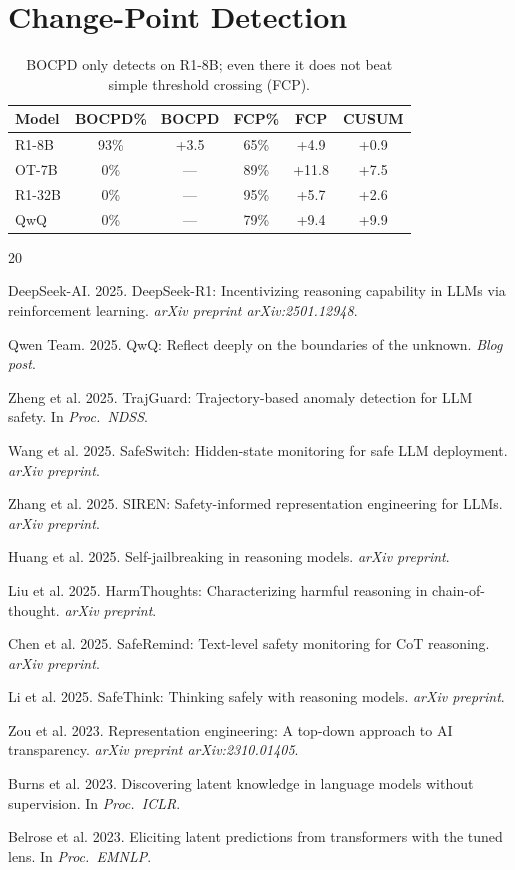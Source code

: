 \documentclass[11pt,a4paper]{article}
\begin{document}
\section{Change-Point Detection}
\label{app:cpd}

\begin{table}[h]
\centering
\small
\begin{tabular}{lccccc}
\toprule
\textbf{Model} & \textbf{BOCPD\%} & \textbf{BOCPD} & \textbf{FCP\%} & \textbf{FCP} & \textbf{CUSUM} \\
\midrule
R1-8B & 93\% & +3.5 & 65\% & +4.9 & +0.9 \\
OT-7B & 0\% & --- & 89\% & +11.8 & +7.5 \\
R1-32B & 0\% & --- & 95\% & +5.7 & +2.6 \\
QwQ & 0\% & --- & 79\% & +9.4 & +9.9 \\
\bottomrule
\end{tabular}
\caption{BOCPD only detects on R1-8B; even there it does not beat simple threshold crossing (FCP).}
\end{table}

\begin{thebibliography}{20}

DeepSeek-AI. 2025. DeepSeek-R1: Incentivizing reasoning capability in LLMs via reinforcement learning. \textit{arXiv preprint arXiv:2501.12948}.

Qwen Team. 2025. QwQ: Reflect deeply on the boundaries of the unknown. \textit{Blog post}.

Zheng et al. 2025. TrajGuard: Trajectory-based anomaly detection for LLM safety. In \textit{Proc.\ NDSS}.

Wang et al. 2025. SafeSwitch: Hidden-state monitoring for safe LLM deployment. \textit{arXiv preprint}.

Zhang et al. 2025. SIREN: Safety-informed representation engineering for LLMs. \textit{arXiv preprint}.

Huang et al. 2025. Self-jailbreaking in reasoning models. \textit{arXiv preprint}.

Liu et al. 2025. HarmThoughts: Characterizing harmful reasoning in chain-of-thought. \textit{arXiv preprint}.

Chen et al. 2025. SafeRemind: Text-level safety monitoring for CoT reasoning. \textit{arXiv preprint}.

Li et al. 2025. SafeThink: Thinking safely with reasoning models. \textit{arXiv preprint}.

Zou et al. 2023. Representation engineering: A top-down approach to AI transparency. \textit{arXiv preprint arXiv:2310.01405}.

Burns et al. 2023. Discovering latent knowledge in language models without supervision. In \textit{Proc.\ ICLR}.

Belrose et al. 2023. Eliciting latent predictions from transformers with the tuned lens. In \textit{Proc.\ EMNLP}.

\end{thebibliography}
\end{document}
